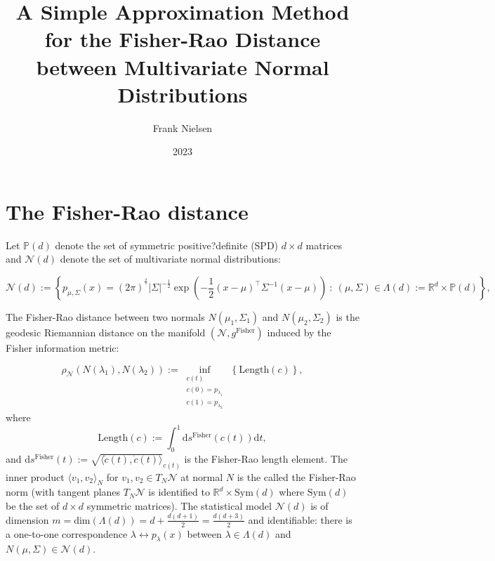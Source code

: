 \documentclass{article}
\title{A Simple Approximation Method for the Fisher-Rao Distance between Multivariate Normal Distributions}
\author{Frank Nielsen}
\date{2023}
\def\Sym{\mathrm{Sym}}
\def\bbP{\mathbb{P}}
\def\Sym{\mathrm{Sym}}
\def\bbR{\mathbb{R}}
\def\Fisher{\mathrm{Fisher}}
\def\inner#1#2{{\langle #1, #2\rangle}}
\def\calN{\mathcal{N}}
\def\Length{\mathrm{Length}}
\def\dt{\mathrm{d}t}
\def\dim{\mathrm{dim}}
\def\ds{\mathrm{d}s}
\def\st{\ :\ }
\def\bbR{\mathbb{R}}
\begin{document}
\maketitle


\section{The Fisher-Rao distance}

Let $\bbP(d)$ denote the set of symmetric positive?definite (SPD) $d\times d$ matrices and $\calN(d)$ denote 
the set of multivariate normal distributions:

$$
\calN(d):=\left\{p_{\mu,\Sigma}(x)= (2\pi)^{^\frac{d}{2}} |\Sigma|^{-\frac{1}{2}} \exp\left(-\frac{1}{2}(x-\mu)^\top\Sigma^{-1}(x-\mu)\right) 
\st   (\mu,\Sigma)\in\Lambda(d):=\bbR^d\times \bbP(d)
\right\},
$$


The Fisher-Rao distance between two normals $N(\mu_1,\Sigma_1)$ and $N(\mu_2,\Sigma_2)$ is the geodesic Riemannian distance on the manifold $(\calN,g^\Fisher)$ induced by the Fisher information metric:

$$
\rho_\calN(N(\lambda_1),N(\lambda_2)):=\inf_{\substack{c(t)\\ c(0)=p_{\lambda_1}\\ c(1)=p_{\lambda_2}}}  \, \left\{\Length(c)\right\},
$$
\noindent where 
$$
\Length(c):=\int_0^1  \ds^\Fisher(c(t)) \dt,
$$
and $\ds^\Fisher(t):=\sqrt{\inner{\dot c(t)}{\dot c(t)}}_{c(t)}$ is the Fisher-Rao length element.
The inner product $\inner{v_1}{v_2}_{N}$ for $v_1,v_2\in T_N\calN$ at normal $N$ is the called the Fisher-Rao norm (with tangent planes $T_N\calN$ is identified  to $\bbR^d\times\Sym(d)$ where $\Sym(d)$ be the set of $d\times d$ symmetric matrices).
The statistical model $\calN(d)$ is of dimension $m=\dim(\Lambda(d))=d+\frac{d(d+1)}{2}=\frac{d(d+3)}{2}$ and identifiable:
there is a one-to-one correspondence $\lambda \leftrightarrow p_\lambda(x)$ between $\lambda\in\Lambda(d)$ and $N(\mu,\Sigma)\in\calN(d)$.
\end{document}

